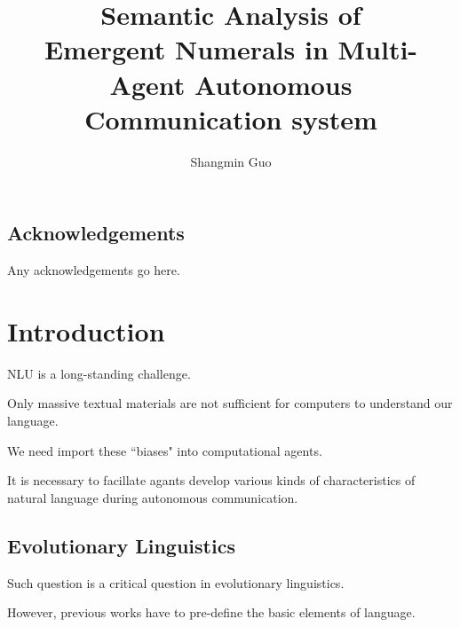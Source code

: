 \documentclass[msc,deptreport]{infthesis} %
\begin{document}
\begin{preliminary}

\title{Semantic Analysis of \\ Emergent Numerals in Multi-Agent Autonomous Communication system}

\author{Shangmin Guo}


\maketitle

\section*{Acknowledgements}
Any acknowledgements go here. 

\tableofcontents
\end{preliminary}


\chapter{Introduction}
\label{ch1:intro}

NLU is a long-standing challenge.

Only massive textual materials are not sufficient for computers to understand our language.

We need import these ``biases" into computational agents.

It is necessary to facillate agants develop various kinds of characteristics of natural language during autonomous communication.

\section{Evolutionary Linguistics}
\label{sec1.1:evo_lang}

Such question is a critical question in evolutionary linguistics.

However, previous works have to pre-define the basic elements of language.
\end{document}
